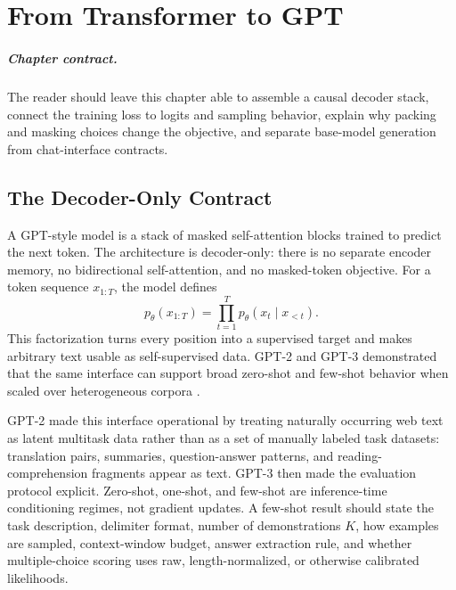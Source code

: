 \chapter{From Transformer to GPT}
\label{ch:from-transformer-to-gpt}


\paragraph{Chapter contract.} The reader should leave this chapter able to assemble a causal decoder stack, connect the training loss to logits and sampling behavior, explain why packing and masking choices change the objective, and separate base-model generation from chat-interface contracts.

\section{The Decoder-Only Contract}
\label{sec:decoder-only-contract}

A GPT-style model is a stack of masked self-attention blocks trained to predict the next token. The architecture is decoder-only: there is no separate encoder memory, no bidirectional self-attention, and no masked-token objective. For a token sequence $x_{1:T}$, the model defines
\begin{equation}
  p_{\theta}(x_{1:T}) =
  \prod_{t=1}^{T} p_{\theta}(x_t \mid x_{<t}).
\end{equation}
This factorization turns every position into a supervised target and makes arbitrary text usable as self-supervised data. GPT-2 and GPT-3 demonstrated that the same interface can support broad zero-shot and few-shot behavior when scaled over heterogeneous corpora \cite{radford2019language,brown2020language}.

GPT-2 made this interface operational by treating naturally occurring web text as latent multitask data rather than as a set of manually labeled task datasets: translation pairs, summaries, question-answer patterns, and reading-comprehension fragments appear as text. GPT-3 then made the evaluation protocol explicit. Zero-shot, one-shot, and few-shot are inference-time conditioning regimes, not gradient updates. A few-shot result should state the task description, delimiter format, number of demonstrations $K$, how examples are sampled, context-window budget, answer extraction rule, and whether multiple-choice scoring uses raw, length-normalized, or otherwise calibrated likelihoods.


